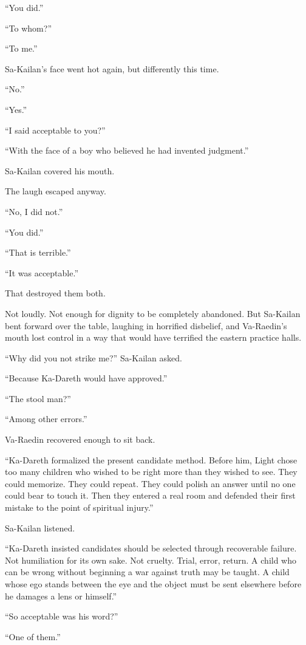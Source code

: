 “You did.”\par
“To whom?”\par
“To me.”\par
Sa-Kailan’s face went hot again, but differently this time.\par
“No.”\par
“Yes.”\par
“I said acceptable to you?”\par
“With the face of a boy who believed he had invented judgment.”\par
Sa-Kailan covered his mouth.\par
The laugh escaped anyway.\par
“No, I did not.”\par
“You did.”\par
“That is terrible.”\par
“It was acceptable.”\par
That destroyed them both.\par
Not loudly. Not enough for dignity to be completely abandoned. But Sa-Kailan bent forward over the table, laughing in horrified disbelief, and Va-Raedin’s mouth lost control in a way that would have terrified the eastern practice halls.\par
“Why did you not strike me?” Sa-Kailan asked.\par
“Because Ka-Dareth would have approved.”\par
“The stool man?”\par
“Among other errors.”\par
Va-Raedin recovered enough to sit back.\par
“Ka-Dareth formalized the present candidate method. Before him, Light chose too many children who wished to be right more than they wished to see. They could memorize. They could repeat. They could polish an answer until no one could bear to touch it. Then they entered a real room and defended their first mistake to the point of spiritual injury.”\par
Sa-Kailan listened.\par
“Ka-Dareth insisted candidates should be selected through recoverable failure. Not humiliation for its own sake. Not cruelty. Trial, error, return. A child who can be wrong without beginning a war against truth may be taught. A child whose ego stands between the eye and the object must be sent elsewhere before he damages a lens or himself.”\par
“So acceptable was his word?”\par
“One of them.”\par
